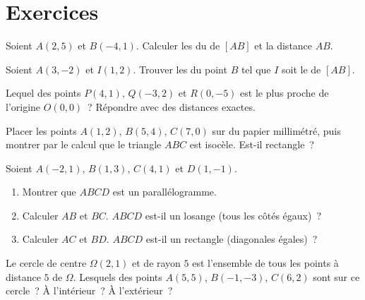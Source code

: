 \section{Exercices}

\begin{exercise}[$\star$]\label{exo:g10:coordgeom:1}
Soient $A(2, 5)$ et $B(-4, 1)$. Calculer les  du  de
$[AB]$ et la distance $AB$.
\end{exercise}

\begin{exercise}[$\star$]\label{exo:g10:coordgeom:2}
Soient $A(3, -2)$ et $I(1, 2)$. Trouver les  du point $B$ tel
que $I$ soit le  de $[AB]$.
\end{exercise}

\begin{exercise}[$\star$]\label{exo:g10:coordgeom:3}
Lequel des points $P(4, 1)$, $Q(-3, 2)$ et $R(0, -5)$ est le plus proche
de l'origine $O(0,0)$~? Répondre avec des distances exactes.
\end{exercise}

\begin{exercise}[$\star$]\label{exo:g10:coordgeom:4}
Placer les points $A(1, 2)$, $B(5, 4)$, $C(7, 0)$ sur du papier
millimétré, puis montrer par le calcul que le triangle $ABC$ est isocèle.
Est-il rectangle~?
\end{exercise}

\begin{exercise}[$\star\star$]\label{exo:g10:coordgeom:5}
Soient $A(-2, 1)$, $B(1, 3)$, $C(4, 1)$ et $D(1, -1)$.
\begin{enumerate}
  \item Montrer que $ABCD$ est un parallélogramme.
  \item Calculer $AB$ et $BC$. $ABCD$ est-il un losange (tous les côtés
        égaux)~?
  \item Calculer $AC$ et $BD$. $ABCD$ est-il un rectangle (diagonales
        égales)~?
\end{enumerate}
\end{exercise}

\begin{exercise}[$\star\star$]\label{exo:g10:coordgeom:6}
Le cercle de centre $\Omega(2, 1)$ et de rayon $5$ est l'ensemble de
tous les points à distance $5$ de $\Omega$. Lesquels des points
$A(5, 5)$, $B(-1, -3)$, $C(6, 2)$ sont sur ce cercle~? À l'intérieur~?
À l'extérieur~?
\end{exercise}

